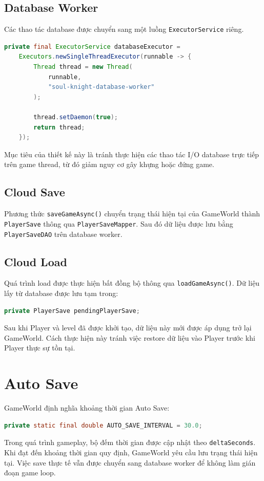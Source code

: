 \documentclass[12pt,a4paper]{report}
\begin{document}
    \subsection{Database Worker}
    Các thao tác database được chuyển sang một luồng
    \texttt{ExecutorService} riêng.
    \begin{lstlisting}[language=Java]
private final ExecutorService databaseExecutor =
    Executors.newSingleThreadExecutor(runnable -> {
        Thread thread = new Thread(
            runnable,
            "soul-knight-database-worker"
        );

        thread.setDaemon(true);
        return thread;
    });
    \end{lstlisting}
    Mục tiêu của thiết kế này là tránh thực hiện các thao tác I/O
    database trực tiếp trên game thread, từ đó giảm nguy cơ gây
    khựng hoặc đứng game.

    \subsection{Cloud Save}
    Phương thức \texttt{saveGameAsync()} chuyển trạng thái hiện tại
    của GameWorld thành \texttt{PlayerSave} thông qua
    \texttt{PlayerSaveMapper}.
    Sau đó dữ liệu được lưu bằng \texttt{PlayerSaveDAO} trên
    database worker.

    \subsection{Cloud Load}
    Quá trình load được thực hiện bất đồng bộ thông qua
    \texttt{loadGameAsync()}.
    Dữ liệu lấy từ database được lưu tạm trong:
    \begin{lstlisting}[language=Java]
private PlayerSave pendingPlayerSave;
    \end{lstlisting}
    Sau khi Player và level đã được khởi tạo, dữ liệu này mới được
    áp dụng trở lại GameWorld.
    Cách thực hiện này tránh việc restore dữ liệu vào Player trước
    khi Player thực sự tồn tại.


    \section{Auto Save}
    GameWorld định nghĩa khoảng thời gian Auto Save:
    \begin{lstlisting}[language=Java]
private static final double AUTO_SAVE_INTERVAL = 30.0;
    \end{lstlisting}
    Trong quá trình gameplay, bộ đếm thời gian được cập nhật theo
    \texttt{deltaSeconds}. Khi đạt đến khoảng thời gian quy định,
    GameWorld yêu cầu lưu trạng thái hiện tại.
    Việc save thực tế vẫn được chuyển sang database worker để không
    làm gián đoạn game loop.
\end{document}
